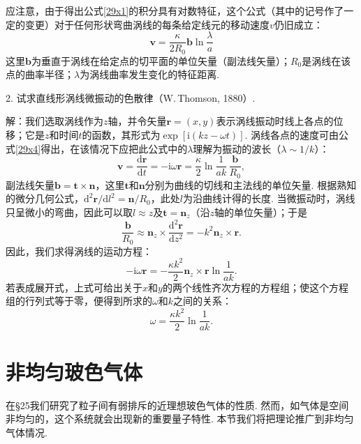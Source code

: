 \begin{xiti}
应注意，由于得出公式\eqref{29x1}的积分具有对数特征，这个公式（其中的记号作了一定的变更）对于任何形状弯曲涡线的每条给定线元的移动速度$v$仍旧成立：
\begin{equation}
\bm{v}=\frac{\kappa}{2R_{0}}\bm{b}\ln\frac{\lambda}{a}
\label{29x4}
\end{equation}
这里$\bm{b}$为垂直于涡线在给定点的切平面的单位矢量（副法线矢量）；$R_{0}$是涡线在该点的曲率半径；$\lambda$为涡线曲率发生变化的特征距离.

2. 试求直线形涡线微振动的色散律（W.\,Thomson, 1880）.

{\heiti 解：}我们选取涡线作为$z$轴，并令矢量$\bm{r}=(x,y)$表示涡线振动时线上各点的位移；它是$z$和时间$t$的函数，其形式为$\exp[\mathrm{i}(kz-\omega t)]$. 涡线各点的速度可由公式\eqref{29x4}得出，在该情况下应把此公式中的$\lambda$理解为振动的波长（$\lambda\sim1/k$）：
\begin{equation*}
\bm{v}=\frac{\mathrm{d}\bm{r}}{\mathrm{d}t}=-\mathrm{i}\omega\bm{r}
=\frac{\kappa}{2}\ln\frac{1}{ak}\,\frac{\bm{b}}{R_{0}},
\end{equation*}
副法线矢量$\bm{b}=\bm{t}\times\bm{n}$，这里$\bm{t}$和$\bm{n}$分别为曲线的切线和主法线的单位矢量. 根据熟知的微分几何公式，$\mathrm{d}^{2}\bm{r}/\mathrm{d}l^{2}=\bm{n}/R_{0}$，此处$l$为沿曲线计得的长度. 当微振动时，涡线只呈微小的弯曲，因此可以取$l\approx z$及$\bm{t}=\bm{n}_{z}$（沿$z$轴的单位矢量）；于是
\begin{equation*}
\frac{\bm{b}}{R_{0}}\approx\bm{n}_{z}\times\frac{\mathrm{d}^{2}\bm{r}}{\mathrm{d}z^{2}}
=-k^{2}\bm{n}_{z}\times\bm{r}.
\end{equation*}
因此，我们求得涡线的运动方程：
\begin{equation*}
-\mathrm{i}\omega\bm{r}
=-\frac{\kappa k^{2}}{2}\bm{n}_{z}\times\bm{r}\ln\frac{1}{ak}.
\end{equation*}
若表成展开式，上式可给出关于$x$和$y$的两个线性齐次方程的方程组；使这个方程组的行列式等于零，便得到所求的$\omega$和$k$之间的关系：
\begin{equation*}
\omega=\frac{\kappa k^{2}}{2}\ln\frac{1}{ak}.
\end{equation*}

\end{xiti}

\section{非均匀玻色气体}

在§25我们研究了粒子间有弱排斥的近理想玻色气体的性质. 然而，如气体是空间非均匀的，这个系统就会出现新的重要量子特性. 本节我们将把理论推广到非均匀气体情况.

